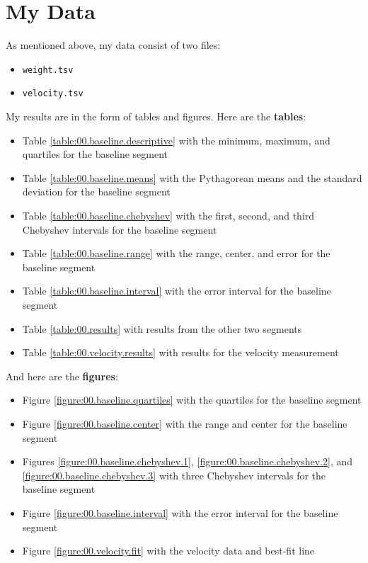 \section{My Data}
%
As mentioned above, my data consist of two files:
\begin{itemize}
    \item \texttt{weight.tsv}
    \item \texttt{velocity.tsv}
\end{itemize}
My results are in the form of tables and figures. Here are the \textbf{tables}:
\begin{itemize}
    \item Table \ref{table:00.baseline.descriptive} with the minimum, maximum, and quartiles for the baseline segment
    \item Table \ref{table:00.baseline.means} with the Pythagorean means and the standard deviation for the baseline segment
    \item Table \ref{table:00.baseline.chebyshev} with the first, second, and third Chebyshev intervals for the baseline segment
    \item Table \ref{table:00.baseline.range} with the range, center, and error for the baseline segment
    \item Table \ref{table:00.baseline.interval} with the error interval for the baseline segment
    \item Table \ref{table:00.results} with results from the other two segments
    \item Table \ref{table:00.velocity.results} with results for the velocity measurement
\end{itemize}
And here are the \textbf{figures}:
\begin{itemize}
    \item Figure \ref{figure:00.baseline.quartiles} with the quartiles for the baseline segment
    \item Figure \ref{figure:00.baseline.center} with the range and center for the baseline segment
    \item Figures \ref{figure:00.baseline.chebyshev.1}, \ref{figure:00.baseline.chebyshev.2}, and \ref{figure:00.baseline.chebyshev.3} with three Chebyshev intervals for the baseline segment
    \item Figure \ref{figure:00.baseline.interval} with the error interval for the baseline segment
    \item Figure \ref{figure:00.velocity.fit} with the velocity data and best-fit line
\end{itemize}
